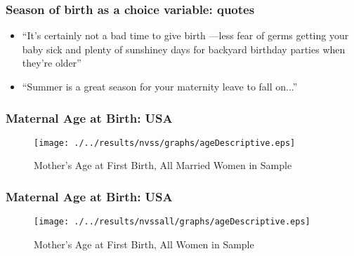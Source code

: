 \documentclass[10pt,letterpaper,subeqn]{beamer}
\begin{document}
\begin{frame}[label=anecdotes]
\frametitle{Season of birth as a choice variable: quotes}
\begin{itemize}
\item ``It's certainly not a bad time to give birth ---less fear of germs getting your baby sick and plenty of sunshiney days for backyard birthday parties when they're older''
\item ``Summer is a great season for your maternity leave to fall on...''
\end{itemize}
\hyperlink{thispaper}{}
\end{frame}


\begin{frame}[label=ageHist]
\frametitle{Maternal Age at Birth: USA}
\begin{figure}[htpb!]
\begin{center}
  \centering
  \caption{Mother's Age at First Birth, All Married Women in Sample}
  \texttt{[image: ./../results/nvss/graphs/ageDescriptive.eps]}
  \label{fig:NVSSbirths}
\end{center}
\end{figure}
\vspace{-5mm}
\end{frame}

\begin{frame}[label=ageHist2]
\frametitle{Maternal Age at Birth: USA}
\begin{figure}[htpb!]
\begin{center}
  \centering
  \caption{Mother's Age at First Birth, All Women in Sample}
  \texttt{[image: ./../results/nvssall/graphs/ageDescriptive.eps]}
  \label{fig:NVSSbirthsAll}
\end{center}
\end{figure}
\vspace{-5mm}
\hyperlink{Data}{}
\end{frame}

\begin{frame}[label=MSum]
  \begin{table}[htpb!]
    \caption{Summary of MTurk Variables (Full Sample)}
  \end{table}
\hyperlink{MMain}{}  
\end{frame}
\end{document}
